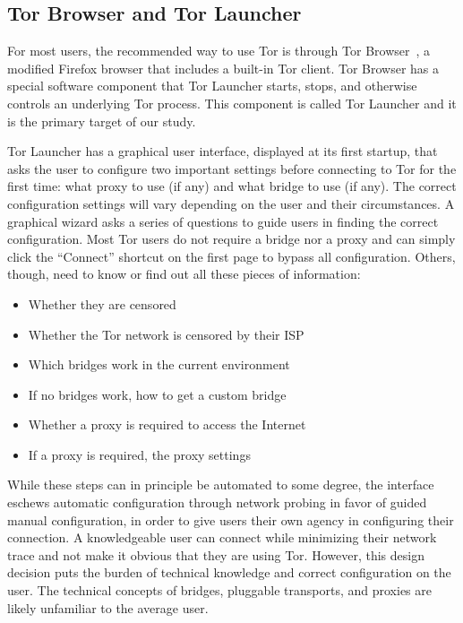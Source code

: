 \documentclass[USenglish,oneside,twocolumn]{article}
\begin{document}
\subsection{Tor Browser and Tor Launcher}

For most users, the recommended way to use Tor is through Tor Browser~\cite{torbrowser},
a modified Firefox browser that includes a built-in Tor client.
Tor Browser has a special software component that
Tor Launcher starts, stops, and otherwise controls
an underlying Tor process.
This component is called Tor Launcher
and it is the primary target of our study.

Tor Launcher has a graphical user interface,
displayed at its first startup, that asks the user
to configure two important settings before connecting to Tor
for the first time:
what proxy to use (if any) and what bridge to use (if any).
The correct configuration settings will vary depending
on the user and their circumstances.
A graphical wizard asks a series of questions to guide
users in finding the correct configuration.
Most Tor users do not require a bridge nor a proxy and
can simply click the ``Connect'' shortcut on
the first page to bypass all configuration.
Others, though, need to know or find out
all these pieces of information:

\begin{itemize}
	\item{Whether they are censored} 
	\item{Whether the Tor network is censored by their ISP}
	\item{Which bridges work in the current environment} 
	\item{If no bridges work, how to get a custom bridge} 
	\item{Whether a proxy is required to access the Internet}
	\item{If a proxy is required, the proxy settings}
\end{itemize}

While these steps can in principle be automated to some degree,
the interface eschews automatic configuration through network probing
in favor of guided manual configuration,
in order to give users their own agency in configuring their connection.
A knowledgeable user can connect while minimizing their network trace
and not make it obvious that they are using Tor.
However, this design decision puts the burden of technical knowledge and correct configuration on the user.
The technical concepts of bridges, pluggable transports, and proxies are likely unfamiliar to the average user.
\end{document}
